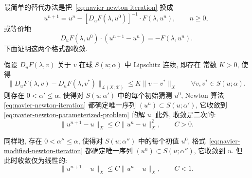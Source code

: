 最简单的替代办法是把 \,\eqref{eq:navier-newton-iteration} 换成
\begin{equation}
\label{eq:navier-modified-newton-iteration}
u^{n+1}=u^n-[D_uF(\lambda,u^0)]^{-1}\mathbin{\cdot}F(\lambda,u^n),
\qquad n\geq0,
\end{equation}
或等价地
\[
D_uF(\lambda,u^0)\mathbin{\cdot}(u^{n+1}-u^n)=-F(\lambda,u^n).
\]
下面证明这两个格式都收敛.

\setcounter{statement}{2}
\begin{Theorem}
\label{thm:navier-newton-local-convergence}
假设 $D_uF(\lambda,v)$ 关于 $v$ 在球 $S(u;\alpha)$ 中 Lipschitz 连续, 即存在
常数 $K>0$, 使得
\begin{equation}
\label{eq:navier-newton-derivative-lipschitz}
\|D_uF(\lambda,v)-D_uF(\lambda,v^*)\|_{\mathcal L(X;\mathscr X)}
\leq K\|v-v^*\|_X
\qquad\forall v,v^*\in S(u;\alpha).
\end{equation}
则存在 $0<\alpha'\leq\alpha$, 使得对 $S(u;\alpha')$ 中的每个初始猜测
$u^0$, Newton 算法 \,\eqref{eq:navier-newton-iteration} 都确定唯一序列
$(u^n)\subset S(u;\alpha')$, 它收敛到 \,\eqref{eq:navier-newton-parameterized-problem}
的解 $u$. 此外, 收敛是二次的:
\begin{equation}
\label{eq:navier-newton-quadratic-rate}
\|u^{n+1}-u\|_X\leq C\|u^n-u\|_X^2,
\qquad C>0.
\end{equation}

同样地, 存在 $0<\alpha''\leq\alpha$, 使得对 $S(u;\alpha'')$ 中的每个初值
$u^0$, 格式 \,\eqref{eq:navier-modified-newton-iteration} 都确定唯一序列
$(u^n)\subset S(u;\alpha'')$, 它收敛到 $u$. 但此时收敛仅为线性的:
\begin{equation}
\label{eq:navier-modified-newton-linear-rate}
\|u^{n+1}-u\|_X\leq C\|u^n-u\|_X,
\qquad C<1.
\end{equation}
\end{Theorem}

